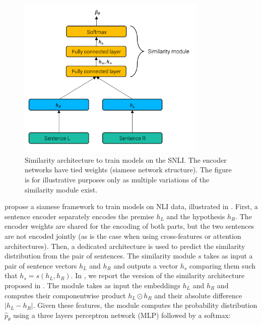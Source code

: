\begin{figure}[!ht]
	\includegraphics[width=9cm]{images/similarity-module.png}
	\caption{Similarity architecture to train models on the SNLI. The encoder networks have tied weights (siamese network structure). The figure is for illustrative purposes only as multiple variations of the similarity module exist.}
\end{figure}

\textcite{conneau_17} propose a siamese framework to train models on NLI data, illustrated in . First, a sentence encoder separately encodes the premise $h_L$ and the hypothesis $h_R$. The encoder weights are shared for the encoding of both parts, but the two sentences are not encoded jointly (as is the case when using cross-features or attention architectures). Then, a dedicated architecture is used to predict the similarity distribution from the pair of sentences. The similarity module $s$ takes as input a pair of sentence vectors $h_{L} $ and $h_{R}$  and outputs a vector $h_s$ comparing them such that $h_s = s(h_{L}, h_{R})$. In , we report the version of the similarity architecture proposed in \textcite{conneau_17}. The module takes as input the embeddings $h_{L} $ and $h_{R}$ and computes their component\-wise product $h_{L} \odot h_{R}$ and their absolute difference $|h_{L} - h_{R}|$. Given these features, the module computes the probability distribution  $\hat{p}_{\theta}$ using a three layers perceptron network (MLP) followed by a softmax:

